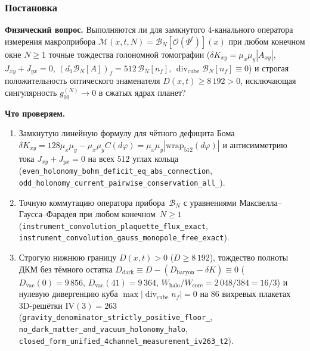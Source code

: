\label{exp:cerd03}

\subsubsection*{Постановка}
\textbf{Физический вопрос.}
Выполняются ли для замкнутого $4$-канального оператора измерения макроприбора $\mathcal{M}(x,t,N) = \mathcal{B}_N[\mathcal{O}(\Psi^t)](x)$ при любом конечном окне $N\ge 1$ точные тождества голономной томографии ($\delta K_{xy} = \mu_x\mu_y|A_{xy}|$, $J_{xy}+J_{yx}=0$, $(d_1\mathcal{B}_N[A])_f = 512\,\mathcal{B}_N[n_f]$, $\operatorname{div}_{\mathrm{cube}}\mathcal{B}_N[n_f]\equiv 0$) и строгая положительность оптического знаменателя $D(x,t) \ge 8\,192 > 0$, исключающая сингулярность $g_{00}^{(N)}\to 0$ в сжатых ядрах планет?

\textbf{Что проверяем.}
{\sloppy
\begin{enumerate}[label=\textbf{(\alph*)},leftmargin=*,itemsep=0.25em]
\item Замкнутую линейную формулу для чётного дефицита Бома $\delta K_{xy} = 128\mu_x\mu_y - \mu_x\mu_y C(d\varphi) = \mu_x\mu_y|\mathrm{wrap}_{512}(d\varphi)|$ и антисимметрию тока $J_{xy}+J_{yx}=0$ на всех $512$ углах кольца (\texttt{even\_\allowbreak holonomy\_\allowbreak bohm\_\allowbreak deficit\_\allowbreak eq\_\allowbreak abs\_\allowbreak connection}, \texttt{odd\_\allowbreak holonomy\_\allowbreak current\_\allowbreak pairwise\_\allowbreak conservation\_\allowbreak all\_}).
\item Точную коммутацию оператора прибора~$\mathcal{B}_N$ с уравнениями Максвелла--Гаусса--Фарадея при любом конечном~$N\ge 1$ (\texttt{instrument\_\allowbreak convolution\_\allowbreak plaquette\_\allowbreak flux\_\allowbreak exact}, \texttt{instrument\_\allowbreak convolution\_\allowbreak gauss\_\allowbreak monopole\_\allowbreak free\_\allowbreak exact}).
\item Строгую нижнюю границу $D(x,t) > 0$ ($D\ge 8\,192$), тождество полноты ДКМ без тёмного остатка $D_{\mathrm{dark}} \equiv D - (D_{\mathrm{baryon}} - \delta K) \equiv 0$ ($D_{\mathrm{vac}}(0)=9\,856$, $D_{\mathrm{vac}}(41)=9\,364$, $W_{\mathrm{halo}}/W_{\mathrm{core}} = 2\,048/384 = 16/3$) и нулевую дивергенцию куба $\max|\operatorname{div}_{\mathrm{cube}} n_f| = 0$ на $86$ вихревых плакетах 3D-решётки $\mathrm{IV}(3)=263$ (\texttt{gravity\_\allowbreak denominator\_\allowbreak strictly\_\allowbreak positive\_\allowbreak floor\_}, \texttt{no\_\allowbreak dark\_\allowbreak matter\_\allowbreak and\_\allowbreak vacuum\_\allowbreak holonomy\_\allowbreak halo}, \texttt{closed\_\allowbreak form\_\allowbreak unified\_\allowbreak 4channel\_\allowbreak measurement\_\allowbreak iv263\_\allowbreak t2}).
\end{enumerate}\par}

